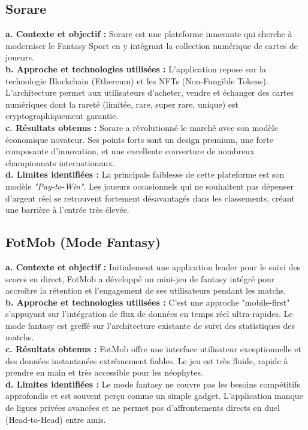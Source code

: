 \subsection{Sorare}
\textbf{a. Contexte et objectif :} Sorare est une plateforme innovante qui cherche à moderniser le Fantasy Sport en y intégrant la collection numérique de cartes de joueurs.\\
\textbf{b. Approche et technologies utilisées :} L'application repose sur la technologie Blockchain (Ethereum) et les NFTs (Non-Fungible Tokens). L'architecture permet aux utilisateurs d'acheter, vendre et échanger des cartes numériques dont la rareté (limitée, rare, super rare, unique) est cryptographiquement garantie.\\
\textbf{c. Résultats obtenus :} Sorare a révolutionné le marché avec son modèle économique novateur. Ses points forts sont un design premium, une forte composante d'innovation, et une excellente couverture de nombreux championnats internationaux.\\
\textbf{d. Limites identifiées :} La principale faiblesse de cette plateforme est son modèle \textit{"Pay-to-Win"}. Les joueurs occasionnels qui ne souhaitent pas dépenser d'argent réel se retrouvent fortement désavantagés dans les classements, créant une barrière à l'entrée très élevée.

\subsection{FotMob (Mode Fantasy)}
\textbf{a. Contexte et objectif :} Initialement une application leader pour le suivi des scores en direct, FotMob a développé un mini-jeu de fantasy intégré pour accroître la rétention et l'engagement de ses utilisateurs pendant les matchs.\\
\textbf{b. Approche et technologies utilisées :} C'est une approche "mobile-first" s'appuyant sur l'intégration de flux de données en temps réel ultra-rapides. Le mode fantasy est greffé sur l'architecture existante de suivi des statistiques des matchs.\\
\textbf{c. Résultats obtenus :} FotMob offre une interface utilisateur exceptionnelle et des données instantanées extrêmement fiables. Le jeu est très fluide, rapide à prendre en main et très accessible pour les néophytes.\\
\textbf{d. Limites identifiées :} Le mode fantasy ne couvre pas les besoins compétitifs approfondis et est souvent perçu comme un simple gadget. L'application manque de ligues privées avancées et ne permet pas d'affrontements directs en duel (Head-to-Head) entre amis.

